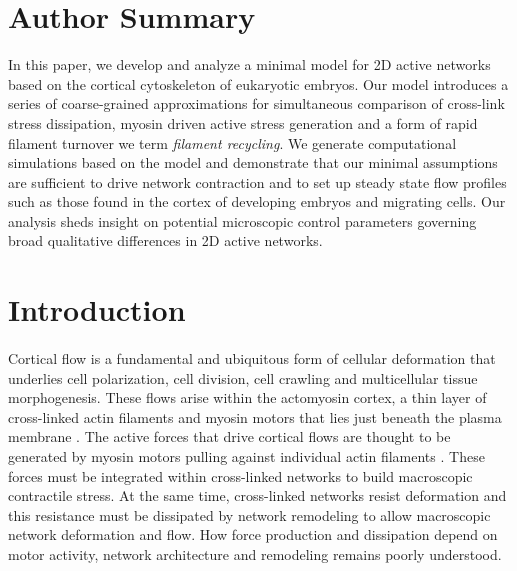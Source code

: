 \documentclass[10pt,letterpaper]{article}
\begin{document}
\section*{Author Summary}
In this paper, we develop and analyze a minimal model for 2D active networks based on the cortical cytoskeleton of eukaryotic embryos.  Our model introduces a series of coarse-grained approximations for simultaneous comparison of cross-link stress dissipation, myosin driven active stress generation and a form of rapid filament turnover we term {\em filament recycling}.  We generate computational simulations based on the model and demonstrate that our minimal assumptions are sufficient to drive network contraction and to set up steady state flow profiles such as those found in the cortex of developing embryos and migrating cells.  Our analysis sheds insight on potential microscopic control parameters governing broad qualitative differences in 2D active networks. 
\linenumbers

\section*{Introduction}

\paragraph{}  Cortical flow is a fundamental and ubiquitous form of cellular deformation that underlies cell polarization, cell division, cell crawling and multicellular tissue morphogenesis\cite{cellmech_flows3,cellmech_flows2}.  These flows arise within the actomyosin cortex, a thin layer of cross-linked actin filaments and myosin motors that lies just beneath the plasma membrane \cite{Salbreux2012536}. The active forces that drive cortical flows are thought to be generated by myosin motors pulling against individual actin filaments \cite{Munro2004413}. These forces must be integrated within cross-linked networks to build macroscopic contractile stress.  At the same time, cross-linked networks resist deformation and this resistance must be dissipated by network remodeling to allow macroscopic network deformation and flow.  How force production and dissipation depend on motor activity, network architecture and remodeling remains poorly understood.
\end{document}
